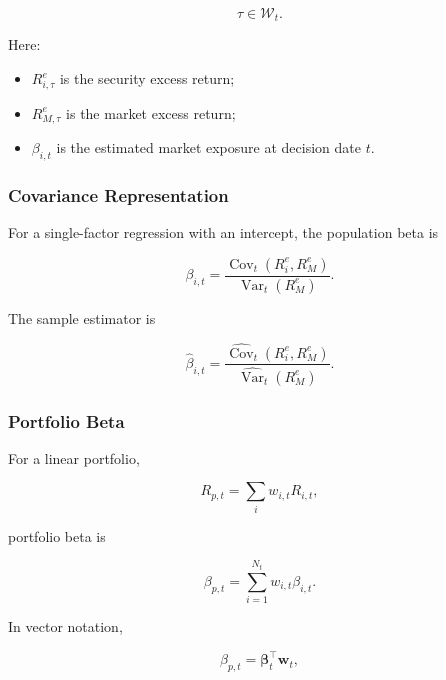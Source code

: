 \documentclass[11pt,a4paper]{article}
\begin{document}
\begin{equation}
\tau
\in
\mathcal{W}_t.
\end{equation}

Here:

\begin{itemize}
    \item $R_{i,\tau}^{e}$ is the security excess return;
    \item $R_{M,\tau}^{e}$ is the market excess return;
    \item $\beta_{i,t}$ is the estimated market exposure at decision date $t$.
\end{itemize}


\subsubsection{Covariance Representation}

For a single-factor regression with an intercept, the population beta is

\begin{equation}
\boxed{
\beta_{i,t}
=
\frac{
\operatorname{Cov}_t
\left(
R_i^{e},
R_M^{e}
\right)
}{
\operatorname{Var}_t
\left(
R_M^{e}
\right)
}.
}
\end{equation}

The sample estimator is

\begin{equation}
\widehat{\beta}_{i,t}
=
\frac{
\widehat{\operatorname{Cov}}_t
\left(
R_i^{e},
R_M^{e}
\right)
}{
\widehat{\operatorname{Var}}_t
\left(
R_M^{e}
\right)
}.
\end{equation}


\subsubsection{Portfolio Beta}

For a linear portfolio,

\begin{equation}
R_{p,t}
=
\sum_i
w_{i,t}
R_{i,t},
\end{equation}

portfolio beta is

\begin{equation}
\boxed{
\beta_{p,t}
=
\sum_{i=1}^{N_t}
w_{i,t}
\beta_{i,t}.
}
\end{equation}

In vector notation,

\begin{equation}
\boxed{
\beta_{p,t}
=
\boldsymbol{\beta}_t^\top
\mathbf{w}_t,
}
\end{equation}
\end{document}
